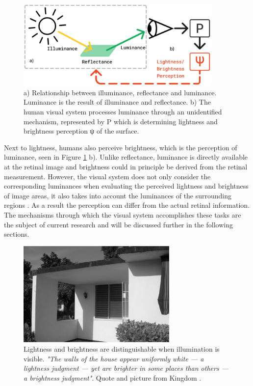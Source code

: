 \begin{figure}[H]
\centering
\centering
\includegraphics[width=0.9\textwidth]{media/lightness_color.png}
\begin{minipage}{0.8\textwidth}
\caption{a) Relationship between illuminance, reflectance and luminance. Luminance is the
result of illuminance and reflectance. b) The human visual system processes luminance
through an unidentified mechanism, represented by P which is determining lightness and
brightness perception ψ of the surface.}
\label{fig:figure1}
\end{minipage}
\end{figure}

Next to lightness, humans also perceive brightness, which is the perception of luminance,
seen in Figure \ref*{fig:figure1} b). Unlike reflectance, luminance is directly available
at the retinal image and brightness could in principle be derived from the retinal
measurement. However, the visual system does not only consider the corresponding
luminances when evaluating the perceived lightness and brightness of image areas, it also
takes into account the luminances of the surrounding regions \parencite{Kingdom1997}. As a
result the perception can differ from the actual retinal information. The mechanisms
through which the visual system accomplishes these tasks are the subject of current
research and will be discussed further in the following sections.
\newpage

\begin{figure}[H]
    \centering
    \includegraphics[width=0.7\textwidth]{media/bright_lightness.png}
    \begin{minipage}{0.8\textwidth}
    \caption{Lightness and brightness are distinguishable when illumination is visible.
    \emph{"The walls of the house appear uniformly white — a lightness judgment — yet are
    brighter in some places than others — a brightness judgment"}. Quote and picture from
    Kingdom \parencite*{Kingdom2014}.}
    \label{fig:figure2}
    \end{minipage}
\end{figure}


